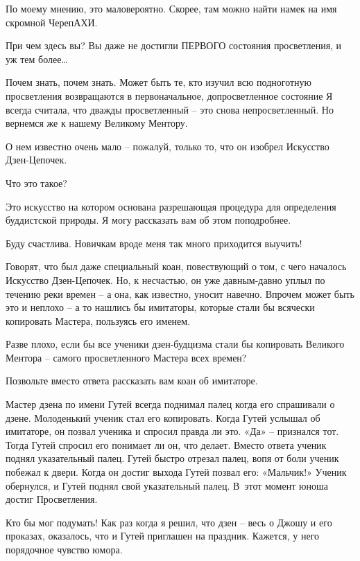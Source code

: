 \documentclass[../main.tex]{subfiles}
\begin{document}
\begin{dialogue}
 По моему мнению, это маловероятно. Скорее, там можно найти намек на имя скромной ЧерепАХИ.

 При чем здесь вы? Вы даже не достигли ПЕРВОГО состояния просветления, и уж тем более\ldots{}

 Почем знать, почем знать. Может быть те, кто изучил всю подноготную просветления возвращаются в первоначальное, допросветленное состояние Я всегда считала, что дважды просветленный \--- это снова непросветленный. Но вернемся же к нашему Великому Ментору.

 О нем известно очень мало \--- пожалуй, только то, что он изобрел Искусство Дзен-Цепочек.

 Что это такое?

 Это искусство на котором основана разрешающая процедура для определения буддистской природы. Я могу рассказать вам об этом поподробнее.

 Буду счастлива. Новичкам вроде меня так много приходится выучить!

 Говорят, что был даже специальный коан, повествующий о том, с чего началось Искусство Дзен-Цепочек. Но, к несчастью, он уже давным-давно уплыл по течению реки времен \--- а она, как известно, уносит навечно. Впрочем может быть это и неплохо \--- а то нашлись бы имитаторы, которые стали бы всячески копировать Мастера, пользуясь его именем.

 Разве плохо, если бы все ученики дзен-будцизма стали бы копировать Великого Ментора \--- самого просветленного Мастера всех времен?

 Позвольте вместо ответа рассказать вам коан об имитаторе.

\begin{koan}
    Мастер дзена по имени Гутей всегда поднимал палец когда его спрашивали о дзене. Молоденький ученик стал его копировать. Когда Гутей услышал об имитаторе, он позвал ученика и спросил правда ли это. «Да» \--- признался тот. Тогда Гутей спросил его понимает ли он, что делает. Вместо ответа ученик поднял указательный палец. Гутей быстро отрезал палец, вопя от боли ученик побежал к двери. Когда он достиг выхода Гутей позвал его: «Мальчик!» Ученик обернулся, и Гутей поднял свой указательный палец. В~этот момент юноша достиг Просветления.
\end{koan}

 Кто бы мог подумать! Как раз когда я решил, что дзен \--- весь о Джошу и его проказах, оказалось, что и Гутей приглашен на праздник. Кажется, у него порядочное чувство юмора.


\end{dialogue}
\end{document}
